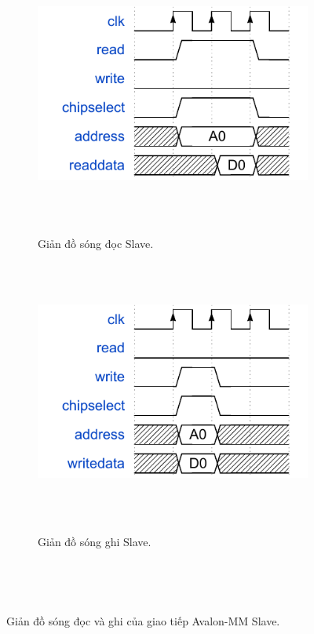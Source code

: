 \begin{enumerate}
    \begin{figure}[htbp]
        \centering
        \begin{subfigure}[b]{0.48\textwidth}
            \centering
            \includegraphics[width=\linewidth]{Images/02_03_AvalonSlave_ReadWaveform.pdf}
            \caption{Giản đồ sóng đọc Slave.}
            \label{fig:02_03_avalon_slave_read_sub}
        \end{subfigure}
        \hfill
        \begin{subfigure}[b]{0.48\textwidth}
            \centering
            \includegraphics[width=\linewidth]{Images/02_04_AvalonSlave_WriteWaveform.pdf}
            \caption{Giản đồ sóng ghi Slave.}
            \label{fig:02_04_avalon_slave_write_sub}
        \end{subfigure}
        \caption{Giản đồ sóng đọc và ghi của giao tiếp Avalon-MM Slave.}
        \label{fig:avalon_slave_waveforms}
    \end{figure}


\end{enumerate}
